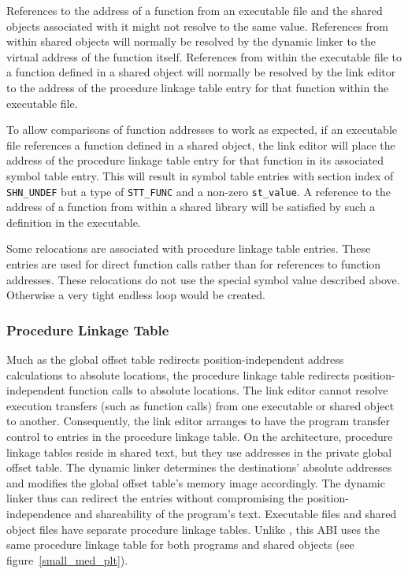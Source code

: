 References to the address of a function from an executable
file and the shared objects associated with it might not resolve to
the same value. References from within shared objects will normally be
resolved by the dynamic linker to the virtual address of the function
itself. References from within the executable file to a function
defined in a shared object will normally be resolved by the link
editor to the address of the procedure linkage table entry for that
function within the executable file.

To allow comparisons of function addresses to work as expected, if an
executable file references a function defined in a shared object, the
link editor will place the address of the procedure linkage table
entry for that function in its associated symbol table entry. This
will result in symbol table entries with section index of {\tt SHN_UNDEF}
but a type of {\tt STT_FUNC} and a non-zero {\tt st_value}.  A reference to the
address of a function from within a shared library will be satisfied
by such a definition in the executable.

Some relocations are associated with procedure linkage table
entries. These entries are used for direct function calls rather than
for references to function addresses. These relocations do not use the special
symbol value described above. Otherwise a very tight endless loop
would be created.

\subsubsection{Procedure Linkage Table}



Much as the global offset table redirects position-independent address
calculations to absolute locations, the procedure linkage table
redirects position-independent function calls to absolute locations.
The link editor cannot resolve execution transfers (such as function
calls) from one executable or shared object to another.  Consequently,
the link editor arranges to have the program transfer control to
entries in the procedure linkage table.  On the \xARCH architecture,
procedure linkage tables reside in shared text, but they use addresses
in the private global offset table.  The dynamic linker determines the
destinations' absolute addresses and modifies the global offset
table's memory image accordingly.  The dynamic linker thus can
redirect the entries without compromising the position-independence
and shareability of the program's text.  Executable files and shared
object files have separate procedure linkage tables.  Unlike
\intelabi, this ABI uses the same procedure linkage table for both
programs and shared objects (see figure~\ref{small_med_plt}).

